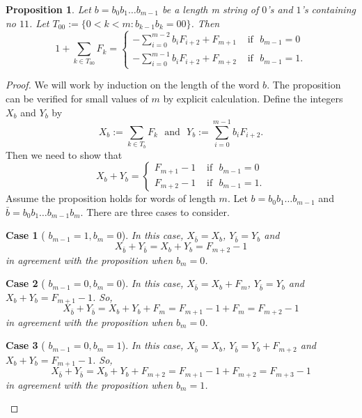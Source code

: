 \documentclass[12pt]{article}
\theoremstyle{plain}
\newtheorem{proposition}[theorem]{Proposition}
\theoremstyle{case}
\newtheorem{case}{Case}
\theoremstyle{definition}
\begin{document}
\begin{proposition}
Let $b = b_0 b_1 \dots b_{m-1}$ be a length m string of $0$'s and $1$'s containing no $11$.  Let $T_{00} := \{0 < k < m : b_{k-1} b_k = 0 0 \}$. Then
\begin{equation*}
1 + \sum_{k \in T_{00}} F_k = 
\begin{cases}
-\sum_{i=0}^{m-2} b_i F_{i+2} + F_{m+1} & \text{   if   }  \,\, b_{m-1} = 0 \\
-\sum_{i=0}^{m-1} b_i F_{i+2} + F_{m+2} & \text{   if   }  \,\, b_{m-1} = 1 .
\end{cases}
\end{equation*}
\end{proposition}
\begin{proof}
We will work by induction on the length of the word $b$. The proposition can be verified for small values of $m$ by explicit calculation. Define the integers $X_b$ and $Y_b$ by
$$
X_b := \sum_{k \in T_{b}} F_k \,\, \text{  and   } \,\, Y_b := \sum_{i=0}^{m-1} b_i F_{i+2} .
$$
Then we need to show that 
\begin{equation*}
X_b + Y_b = 
\begin{cases}
F_{m+1} - 1 & \text{   if   }  \,\, b_{m-1} = 0 \\
F_{m+2} - 1 & \text{   if   }  \,\, b_{m-1} = 1 .
\end{cases}
\end{equation*}
Assume the proposition holds for words of length $m$. Let $b = b_0 b_1 \dots b_{m-1}$ and $\bar{b} = b_0 b_1 \dots b_{m-1} b_m$. There are three cases to consider.

\bigskip
\begin{case}[ $b_{m-1} = 1, b_m = 0$]
In this case, $X_{\bar{b}} = X_b$, $Y_{\bar{b}} = Y_b$ and 
$$
X_{\bar{b}} + Y_{\bar{b}}  = X_b + Y_b = F_{m+2} - 1
$$ 
in agreement with the proposition when $ b_m = 0$.
\end{case}
\bigskip
\begin{case}[ $b_{m-1} = 0, b_m = 0$]
In this case, $X_{\bar{b}} = X_b + F_m$, $Y_{\bar{b}} = Y_b$ and $X_b + Y_b = F_{m+1} - 1$. So,  
$$
X_{\bar{b}} + Y_{\bar{b}}  = X_b + Y_b + F_m = F_{m+1} - 1 + F_m = F_{m+2} - 1
$$
in agreement with the proposition when $ b_m = 0$.
\end{case}
\bigskip
\begin{case}[ $b_{m-1} = 0, b_m = 1$]
In this case, $X_{\bar{b}} = X_b$, $Y_{\bar{b}} = Y_b + F_{m+2}$ and $X_b + Y_b = F_{m+1} - 1$. So,  
$$
X_{\bar{b}} + Y_{\bar{b}}  = X_b + Y_b + F_{m+2} = F_{m+1} - 1 + F_{m+2} = F_{m+3} - 1
$$
in agreement with the proposition when $ b_m = 1$.
\end{case}
\end{proof}
\end{document}
